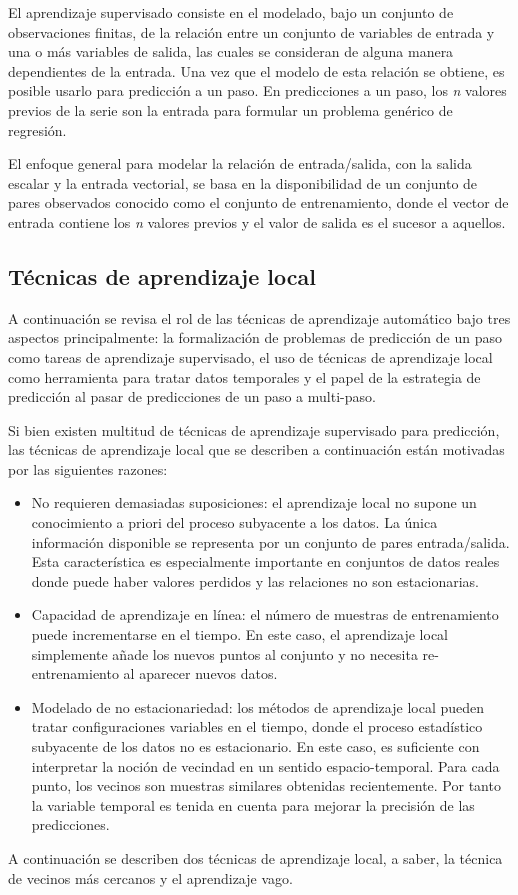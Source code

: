 \documentclass{llncs}
\begin{document}
El aprendizaje supervisado consiste en el modelado, bajo un conjunto de observaciones finitas, de la relación entre un conjunto de variables de entrada y una o más variables de salida, las cuales se consideran de alguna manera dependientes de la entrada. Una vez que el modelo de esta relación se obtiene, es posible usarlo para predicción a un paso. En predicciones a un paso, los \emph{n} valores previos de la serie son la entrada para formular un problema genérico de regresión. 

El enfoque general para modelar la relación de entrada/salida, con la salida escalar y la entrada vectorial, se basa en la disponibilidad de un conjunto de pares observados conocido como el conjunto de entrenamiento, donde el vector de entrada contiene los \emph{n} valores previos y el valor de salida es el sucesor a aquellos.

\subsection{Técnicas de aprendizaje local\\}
A continuación se revisa el rol de las técnicas de aprendizaje automático bajo tres aspectos principalmente: la formalización de problemas de predicción de un paso como tareas de aprendizaje supervisado, el uso de técnicas de aprendizaje local como herramienta para tratar datos temporales y el papel de la estrategia de predicción al pasar de predicciones de un paso a multi-paso. 

Si bien existen multitud de técnicas de aprendizaje supervisado para predicción, las técnicas de aprendizaje local que se describen a continuación están motivadas por las siguientes razones:
\begin{itemize}

\item No requieren demasiadas suposiciones: el aprendizaje local no supone un conocimiento a priori del proceso subyacente a los datos. La única información disponible se representa por un conjunto de pares entrada/salida. Esta característica es especialmente importante en conjuntos de datos reales donde puede haber valores perdidos y las relaciones no son estacionarias. 

\item Capacidad de aprendizaje en línea: el número de muestras de entrenamiento puede incrementarse en el tiempo. En este caso, el aprendizaje local simplemente añade los nuevos puntos al conjunto y no necesita re-entrenamiento al aparecer nuevos datos.

\item Modelado de no estacionariedad: los métodos de aprendizaje local pueden tratar configuraciones variables en el tiempo, donde el proceso estadístico subyacente de los datos no es estacionario. En este caso, es suficiente con interpretar la noción de vecindad en un sentido espacio-temporal. Para cada punto, los vecinos son muestras similares obtenidas recientemente. Por tanto la variable temporal es tenida en cuenta para mejorar la precisión de las predicciones.
\end{itemize}
A continuación se describen dos técnicas de aprendizaje local, a saber, la técnica de vecinos más cercanos y el aprendizaje vago.
\end{document}
